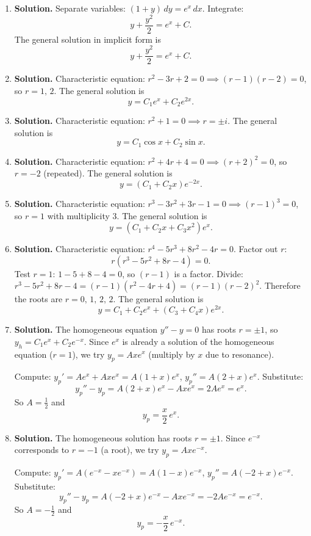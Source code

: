 \begin{enumerate}
\item \textbf{Solution.}
Separate variables: $(1+y)\,dy = e^x\,dx$. Integrate:
\[
y+\frac{y^2}{2}=e^x+C.
\]
The general solution in implicit form is
\[
\boxed{y+\frac{y^2}{2}=e^x+C}.
\]

\item \textbf{Solution.}
Characteristic equation: $r^2-3r+2=0 \implies (r-1)(r-2)=0$, so $r=1,\,2$. The general solution is
\[
\boxed{y = C_1 e^x + C_2 e^{2x}}.
\]

\item \textbf{Solution.}
Characteristic equation: $r^2+1=0 \implies r=\pm i$. The general solution is
\[
\boxed{y = C_1\cos x + C_2\sin x}.
\]

\item \textbf{Solution.}
Characteristic equation: $r^2+4r+4=0 \implies (r+2)^2=0$, so $r=-2$ (repeated). The general solution is
\[
\boxed{y = (C_1+C_2 x)e^{-2x}}.
\]

\item \textbf{Solution.}
Characteristic equation: $r^3-3r^2+3r-1=0 \implies (r-1)^3=0$, so $r=1$ with multiplicity 3. The general solution is
\[
\boxed{y = (C_1+C_2 x+C_3 x^2)e^x}.
\]

\item \textbf{Solution.}
Characteristic equation: $r^4-5r^3+8r^2-4r=0$. Factor out $r$:
\[
r(r^3-5r^2+8r-4)=0.
\]
Test $r=1$: $1-5+8-4=0$, so $(r-1)$ is a factor. Divide: $r^3-5r^2+8r-4=(r-1)(r^2-4r+4)=(r-1)(r-2)^2$. Therefore the roots are $r=0,\,1,\,2,\,2$. The general solution is
\[
\boxed{y = C_1 + C_2 e^x + (C_3+C_4 x)e^{2x}}.
\]

\item \textbf{Solution.}
The homogeneous equation $y''-y=0$ has roots $r=\pm 1$, so $y_h=C_1e^x+C_2e^{-x}$. Since $e^x$ is already a solution of the homogeneous equation ($r=1$), we try $y_p=Axe^x$ (multiply by $x$ due to resonance).

Compute: $y_p'=Ae^x+Axe^x=A(1+x)e^x$, $y_p''=A(2+x)e^x$. Substitute:
\[
y_p''-y_p = A(2+x)e^x-Axe^x=2Ae^x = e^x.
\]
So $A=\frac{1}{2}$ and
\[
\boxed{y_p = \frac{x}{2}\,e^x}.
\]

\item \textbf{Solution.}
The homogeneous solution has roots $r=\pm 1$. Since $e^{-x}$ corresponds to $r=-1$ (a root), we try $y_p=Axe^{-x}$.

Compute: $y_p'=A(e^{-x}-xe^{-x})=A(1-x)e^{-x}$, $y_p''=A(-2+x)e^{-x}$. Substitute:
\[
y_p''-y_p = A(-2+x)e^{-x}-Axe^{-x}=-2Ae^{-x}=e^{-x}.
\]
So $A=-\frac{1}{2}$ and
\[
\boxed{y_p = -\frac{x}{2}\,e^{-x}}.
\]


\end{enumerate}
